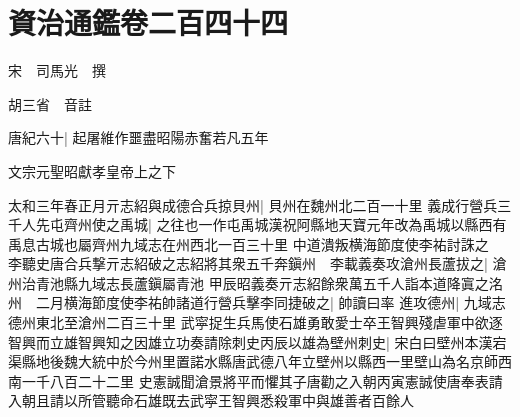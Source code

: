 \chapter{資治通鑑卷二百四十四}
宋　司馬光　撰

胡三省　音註

唐紀六十|{
	起屠維作噩盡昭陽赤奮若凡五年}


文宗元聖昭獻孝皇帝上之下

太和三年春正月亓志紹與成德合兵掠貝州|{
	貝州在魏州北二百一十里}
義成行營兵三千人先屯齊州使之禹城|{
	之往也一作屯禹城漢祝阿縣地天寶元年改為禹城以縣西有禹息古城也屬齊州九域志在州西北一百三十里}
中道潰叛横海節度使李祐討誅之　李聽史唐合兵撃亓志紹破之志紹將其衆五千奔鎭州　李載義奏攻滄州長蘆拔之|{
	滄州治青池縣九域志長蘆鎭屬青池}
甲辰昭義奏亓志紹餘衆萬五千人詣本道降寘之洺州　二月横海節度使李祐帥諸道行營兵擊李同捷破之|{
	帥讀曰率}
進攻德州|{
	九域志德州東北至滄州二百三十里}
武寜捉生兵馬使石雄勇敢愛士卒王智興殘虐軍中欲逐智興而立雄智興知之因雄立功奏請除刺史丙辰以雄為壁州刺史|{
	宋白曰壁州本漢宕渠縣地後魏大統中於今州里置諾水縣唐武德八年立壁州以縣西一里壁山為名京師西南一千八百二十二里}
史憲誠聞滄景將平而懼其子唐勸之入朝丙寅憲誠使唐奉表請入朝且請以所管聽命石雄既去武寜王智興悉殺軍中與雄善者百餘人

